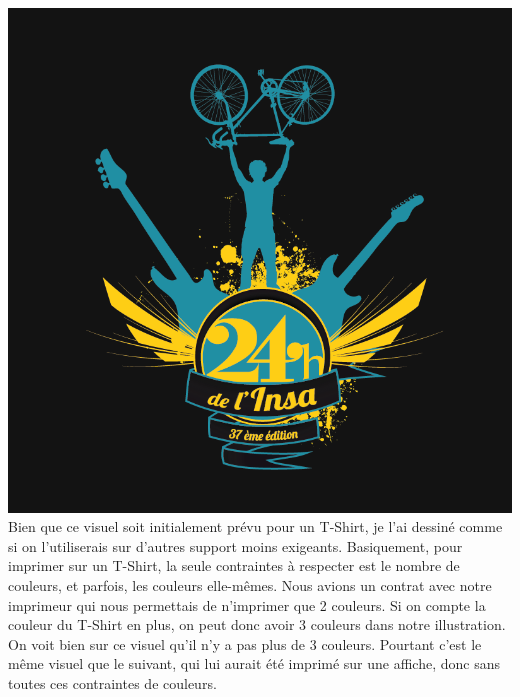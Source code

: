             \begin{center}
                \includegraphics[width=\textwidth]{img/logo-TShirt-bichro.png}
                Bien que ce visuel soit initialement prévu pour un T-Shirt, je l'ai dessiné comme si on l'utiliserais sur d'autres support moins exigeants.
                Basiquement, pour imprimer sur un T-Shirt, la seule contraintes à respecter est le nombre de couleurs, et parfois, les couleurs elle-mêmes.
                Nous avions un contrat avec notre imprimeur qui nous permettais de n'imprimer que 2 couleurs.
                Si on compte la couleur du T-Shirt en plus, on peut donc avoir 3 couleurs dans notre illustration.
                On voit bien sur ce visuel qu'il n'y a pas plus de 3 couleurs.
                Pourtant c'est le même visuel que le suivant, qui lui aurait été imprimé sur une affiche, donc sans toutes ces contraintes de couleurs.
            \end{center}
                
